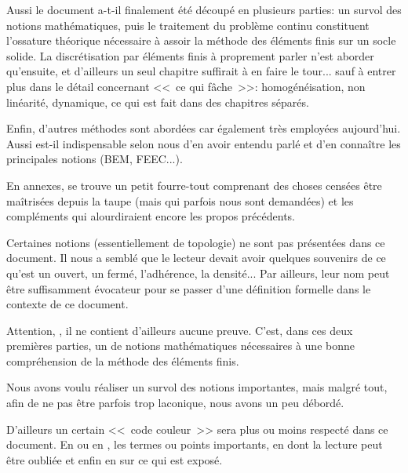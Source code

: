 \documentclass[11pt,pdflatex]{book}
\begin{document}
Aussi le document a-t-il finalement été découpé en plusieurs parties:
un survol des notions mathématiques, puis le traitement du problème
continu constituent l'ossature théorique nécessaire à assoir la méthode des éléments finis
sur un socle solide. La discrétisation par éléments finis à proprement parler
n'est aborder qu'ensuite, et d'ailleurs un seul chapitre suffirait à en faire
le tour... sauf à entrer plus dans le détail concernant <<~ce qui fâche~>>:
homogénéisation, non linéarité, dynamique, ce qui est fait dans des
chapitres séparés.

\medskip
Enfin, d'autres méthodes sont abordées car également très
employées aujourd'hui. Aussi est-il indispensable selon nous d'en avoir 
entendu parlé et d'en connaître les principales notions (BEM, FEEC...).

\medskip
En annexes, se trouve un petit fourre-tout comprenant des choses censées être 
maîtrisées depuis la taupe (mais qui parfois nous sont demandées) et les
compléments qui alourdiraient encore les propos précédents.

\medskip
Certaines notions (essentiellement de topologie) ne sont pas présentées dans ce 
document.
Il nous a semblé que le lecteur devait avoir quelques souvenirs de ce qu'est un
ouvert, un fermé, l'adhérence, la densité...
Par ailleurs, leur nom peut être suffisamment évocateur pour se passer d'une
définition formelle dans le contexte de ce document.

\bigskip
Attention, , il ne contient
d'ailleurs aucune preuve.
C'est, dans ces deux premières parties, un  de 
notions mathématiques nécessaires à une bonne compréhension de la méthode des éléments finis.

Nous avons voulu réaliser un survol des notions importantes, mais malgré tout, afin de ne
pas être parfois trop laconique, nous avons un peu débordé. \ifVersionDuDocEstVincent{}\fi

\medskip
\ifVersionDuDocEstVincent
D'ailleurs un certain <<~code couleur~>> sera plus ou moins respecté dans ce document.
En  ou en , les termes ou points importants,
en  dont la lecture peut être
oubliée et enfin en
 sur ce qui est exposé.
\fi
\end{document}
